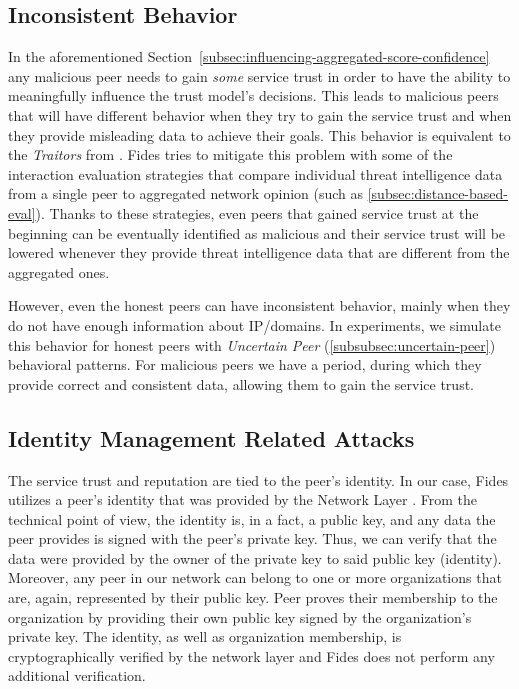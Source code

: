 \subsection{Inconsistent Behavior}
\label{subsec:inconsistent-behavior}
In the aforementioned Section~\ref{subsec:influencing-aggregated-score-confidence} any malicious peer needs to gain \textit{some} service trust in order to have the ability to meaningfully influence the trust model's decisions.
This leads to malicious peers that will have different behavior when they try to gain the service trust and when they provide misleading data to achieve their goals.
This behavior is equivalent to the \textit{Traitors} from \cite{KOUTROULI201247}.
Fides tries to mitigate this problem with some of the interaction evaluation strategies that compare individual threat intelligence data from a single peer to aggregated network opinion (such as \ref{subsec:distance-based-eval}).
Thanks to these strategies, even peers that gained service trust at the beginning can be eventually identified as malicious and their service trust will be lowered whenever they provide threat intelligence data that are different from the aggregated ones.

However, even the honest peers can have inconsistent behavior, mainly when they do not have enough information about IP/domains.
In experiments, we simulate this behavior for honest peers with \textit{Uncertain Peer} (\ref{subsubsec:uncertain-peer}) behavioral patterns.
For malicious peers we have a period, during which they provide correct and consistent data, allowing them to gain the service trust. 

\subsection{Identity Management Related Attacks}
\label{subsec:identity-management-attacks}
The service trust and reputation are tied to the peer's identity. 
In our case, Fides utilizes a peer's identity that was provided by the Network Layer \cite{nl}.
From the technical point of view, the identity is, in a fact, a public key, and any data the peer provides is signed with the peer's private key. Thus, we can verify that the data were provided by the owner of the private key to said public key (identity).
Moreover, any peer in our network can belong to one or more organizations that are, again, represented by their public key. 
Peer proves their membership to the organization by providing their own public key signed by the organization's private key.
The identity, as well as organization membership, is cryptographically verified by the network layer \cite{nl} and Fides does not perform any additional verification. 

